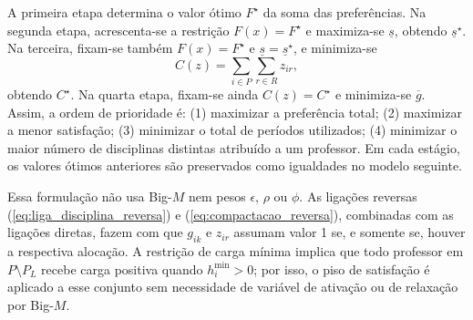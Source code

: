\documentclass[11pt,a4paper]{article}
\begin{document}
A primeira etapa determina o valor ótimo $F^\star$ da soma das preferências. Na segunda etapa, acrescenta-se a restrição $F(x)=F^\star$ e maximiza-se $\underline{s}$, obtendo $\underline{s}^\star$. Na terceira, fixam-se também $F(x)=F^\star$ e $\underline{s}=\underline{s}^\star$, e minimiza-se
\[
C(z)=\sum_{i\in P}\sum_{r\in R}z_{ir},
\]
obtendo $C^\star$. Na quarta etapa, fixam-se ainda $C(z)=C^\star$ e minimiza-se $\overline{g}$. Assim, a ordem de prioridade é: (1) maximizar a preferência total; (2) maximizar a menor satisfação; (3) minimizar o total de períodos utilizados; (4) minimizar o maior número de disciplinas distintas atribuído a um professor. Em cada estágio, os valores ótimos anteriores são preservados como igualdades no modelo seguinte.

Essa formulação não usa Big-$M$ nem pesos $\epsilon$, $\rho$ ou $\phi$. As ligações reversas (\ref{eq:liga_disciplina_reversa}) e (\ref{eq:compactacao_reversa}), combinadas com as ligações diretas, fazem com que $g_{ik}$ e $z_{ir}$ assumam valor 1 se, e somente se, houver a respectiva alocação. A restrição de carga mínima implica que todo professor em $P\setminus P_L$ recebe carga positiva quando $h_i^{\min}>0$; por isso, o piso de satisfação é aplicado a esse conjunto sem necessidade de variável de ativação ou de relaxação por Big-$M$.
\end{document}
